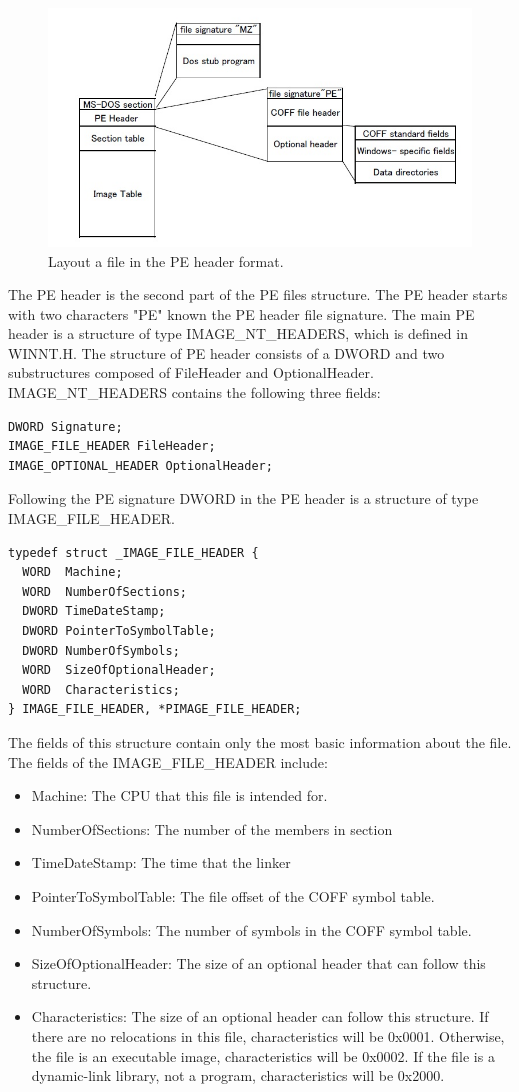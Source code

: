 \begin{figure}[httb]
\centering
\includegraphics[width=1\textwidth]{graph/peheader1.jpg}
\caption{Layout a file in the PE header format.}
\label{fig:peheader}
\end{figure}
The PE header is the second part of the PE files structure. The PE header starts with two characters "PE" known the PE header file signature. The main PE header is a structure of type IMAGE\_NT\_HEADERS, which is defined in WINNT.H. The structure of PE header consists of a DWORD and two substructures composed of FileHeader and OptionalHeader. IMAGE\_NT\_HEADERS contains the following three fields:
\begin{verbatim}
DWORD Signature;
IMAGE_FILE_HEADER FileHeader;
IMAGE_OPTIONAL_HEADER OptionalHeader;
\end{verbatim}
Following the PE signature DWORD in the PE header is a structure of type IMAGE\_FILE\_HEADER. 
\begin{verbatim}
typedef struct _IMAGE_FILE_HEADER {
  WORD  Machine;
  WORD  NumberOfSections;
  DWORD TimeDateStamp;
  DWORD PointerToSymbolTable;
  DWORD NumberOfSymbols;
  WORD  SizeOfOptionalHeader;
  WORD  Characteristics;
} IMAGE_FILE_HEADER, *PIMAGE_FILE_HEADER;
\end{verbatim}
The fields of this structure contain only the most basic information about the file. The fields of the IMAGE\_FILE\_HEADER include:
\begin{itemize}
\item Machine: The CPU that this file is intended for.
\item NumberOfSections: The number of the members in section
\item TimeDateStamp: The time that the linker
\item PointerToSymbolTable: The file offset of the COFF symbol table. 
\item NumberOfSymbols: The number of symbols in the COFF symbol table.
\item SizeOfOptionalHeader: The size of an optional header that can follow this structure.
\item Characteristics: The size of an optional header can follow this structure. If there are no relocations in this file, characteristics will be 0x0001. Otherwise, the file is an executable image, characteristics will be 0x0002.  If the file is a dynamic-link library, not a program, characteristics will be 0x2000.
\end{itemize}


